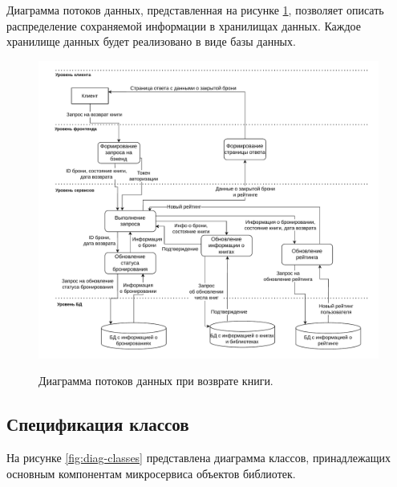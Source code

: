 \documentclass[a4paper, 12pt]{article}
\begin{document}
\begin{large}
\begin{landscape}
\pagebreak
\end{landscape}

Диаграмма потоков данных, представленная на рисунке \ref{fig:data_flow}, позволяет описать распределение сохраняемой информации в хранилищах данных. Каждое хранилище данных будет реализовано в виде базы данных.

\begin{figure}[h!]
	\begin{center}
		{\includegraphics[scale = 0.75]{DataFlow}}
		\caption{Диаграмма потоков данных при возврате книги.}
		\label{fig:data_flow}
	\end{center}
\end{figure} 

\pagebreak

\subsection{Спецификация классов}
На рисунке \ref{fig:diag-classes} представлена диаграмма классов, принадлежащих основным компонентам микросервиса объектов библиотек.


\end{large}
\end{document}
